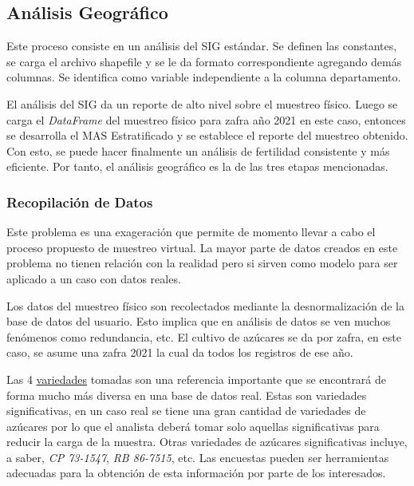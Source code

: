 \documentclass[conference]{IEEEtran}
\begin{document}
\subsection{Análisis Geográfico}

Este proceso consiste en un análisis del SIG estándar. Se definen las constantes, se carga el archivo shapefile y se le da formato correspondiente agregando demás columnas. Se identifica como variable independiente a la columna departamento.

\bigbreak

El análisis del SIG da un reporte de alto nivel sobre el muestreo físico. Luego se carga el \textit{DataFrame} del muestreo físico para zafra año 2021 en este caso, entonces se desarrolla el MAS Estratificado y se establece el reporte del muestreo obtenido. Con esto, se puede hacer finalmente un análisis de fertilidad consistente y más eficiente. Por tanto, el análisis geográfico es la de las tres etapas mencionadas.

\subsubsection{Recopilación de Datos}

Este problema es una exageración que permite de momento llevar a cabo el proceso propuesto de muestreo virtual. La mayor parte de datos creados en este problema no tienen relación con la realidad pero si sirven como modelo para ser aplicado a un caso con datos reales.

\bigbreak

Los datos del muestreo físico son recolectados mediante la desnormalización de la base de datos del usuario. Esto implica que en análisis de datos se ven muchos fenómenos como redundancia, etc. El cultivo de azúcares se da por zafra, en este caso, se asume una zafra 2021 la cual da todos los registros de ese año.

\bigbreak

Las 4 \href{https://www.gob.mx/conadesuca/es/articulos/variedades-de-cana-de-azucar?idiom=es}{variedades} tomadas son una referencia importante que se encontrará de forma mucho más diversa en una base de datos real. Estas son variedades significativas, en un caso real se tiene una gran cantidad de variedades de azúcares por lo que el analista deberá tomar solo aquellas significativas para reducir la carga de la muestra. Otras variedades de azúcares significativas incluye, a saber, \textit{CP 73-1547}, \textit{RB 86-7515}, etc. Las encuestas pueden ser herramientas adecuadas para la obtención de esta información por parte de los interesados.
\end{document}
